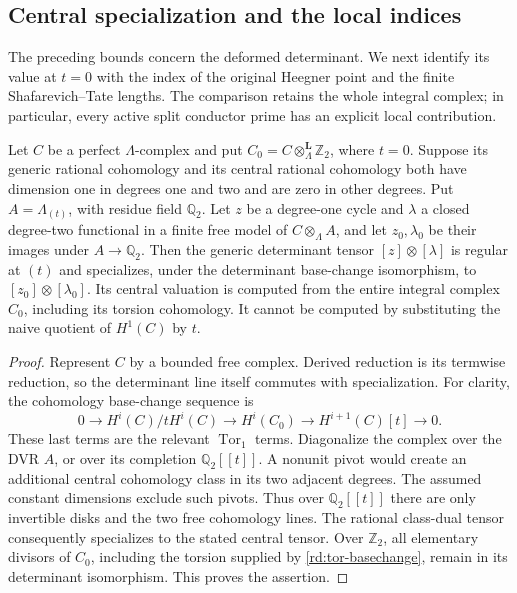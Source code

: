 \subsection{Central specialization and the local indices}
\label{rd:specialization-subsection}

The preceding bounds concern the deformed determinant.  We next identify
its value at $t=0$ with the index of the original Heegner point and the
finite Shafarevich--Tate lengths.  The comparison retains the whole
integral complex; in particular, every active split conductor prime has
an explicit local contribution.

\begin{lemma}
\label{rd:derived-specialization}
Let \(C\) be a perfect \(\Lambda\)-complex and put
\(C_0=C\otimes_\Lambda^{\mathbf L}\mathbb Z_2\), where \(t=0\).
Suppose its generic rational cohomology and its central rational
cohomology both have dimension one in degrees one and two and
are zero in other degrees.  Put \(A=\Lambda_{(t)}\), with residue field \(\mathbb Q_2\).
Let \(z\) be a degree-one cycle and \(\lambda\) a closed
degree-two functional in a finite free model of \(C\otimes_\Lambda A\),
and let \(z_0,\lambda_0\) be their images under \(A\to\mathbb Q_2\).
Then the generic determinant tensor \([z]\otimes[\lambda]\) is
regular at \((t)\) and specializes, under the determinant base-change
isomorphism, to \([z_0]\otimes[\lambda_0]\).  Its central valuation is
computed from the entire integral complex \(C_0\), including
its torsion cohomology.  It cannot be computed by substituting
the naive quotient of \(H^1(C)\) by \(t\).
\end{lemma}

\begin{proof}
Represent \(C\) by a bounded free complex.  Derived reduction
is its termwise reduction, so the determinant line itself
commutes with specialization.  For clarity, the cohomology
base-change sequence is
\begin{equation}
 0\longrightarrow H^i(C)/tH^i(C)
 \longrightarrow H^i(C_0)
 \longrightarrow H^{i+1}(C)[t]\longrightarrow0.
 \label{rd:tor-basechange}
\end{equation}
These last terms are the relevant \(\operatorname{Tor}_1\)
terms.  Diagonalize the complex over the DVR \(A\), or over its
completion \(\mathbb Q_2[[t]]\).  A nonunit pivot
would create an additional central cohomology class in its
two adjacent degrees.  The assumed constant dimensions
exclude such pivots.  Thus over \(\mathbb Q_2[[t]]\) there
are only invertible disks and the two free cohomology lines.
The rational class-dual tensor consequently specializes
to the stated central tensor.  Over \(\mathbb Z_2\), all
elementary divisors of \(C_0\), including the torsion supplied
by \eqref{rd:tor-basechange}, remain in its determinant
isomorphism.  This proves the assertion.
\end{proof}

